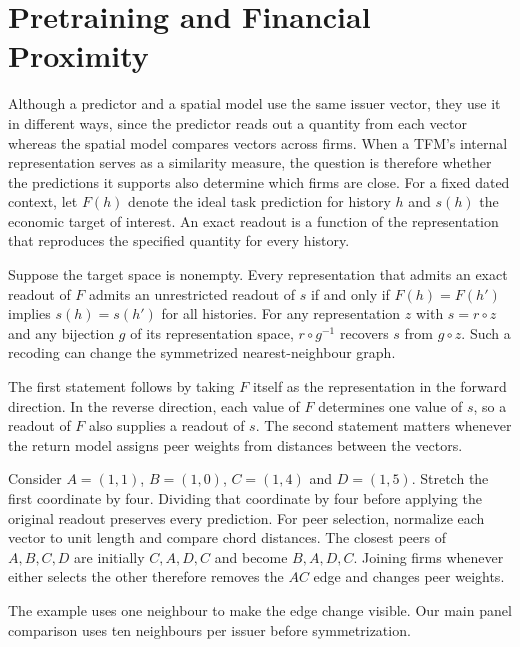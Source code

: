 \section{Pretraining and Financial Proximity}

Although a predictor and a spatial model use the same issuer vector, they
use it in different ways, since the predictor reads out a quantity from
each vector whereas the spatial model compares vectors across firms.
When a TFM's internal representation serves as a similarity measure, the
question is therefore whether the predictions it supports also determine
which firms are close.
For a fixed dated context, let $F(h)$
denote the ideal task prediction for history $h$ and $s(h)$ the economic
target of interest. An exact readout is a function of the representation
that reproduces the specified quantity for every history.

\begin{proposition}
  \label{prop:recovery}
  Suppose the target space is nonempty. Every representation that admits
  an exact readout of $F$ admits an unrestricted readout of $s$ if and only
  if $F(h)=F(h')$ implies $s(h)=s(h')$ for all histories.
  For any representation $z$ with $s=r\circ z$ and any bijection $g$ of
  its representation space, $r\circ g^{-1}$ recovers $s$ from $g\circ z$.
  Such a recoding can change the symmetrized nearest-neighbour graph.
\end{proposition}

The first statement follows by taking $F$ itself as the representation
in the forward direction. In the reverse direction, each value of $F$
determines one value of $s$, so a readout of $F$ also supplies a readout
of $s$. The second statement matters whenever the return model assigns
peer weights from distances between the vectors.

Consider $A=(1,1)$, $B=(1,0)$, $C=(1,4)$ and $D=(1,5)$.
Stretch the first coordinate by four. Dividing that coordinate by four
before applying the original readout preserves every prediction.
For peer selection, normalize each vector to unit
length and compare chord distances. The closest peers of $A,B,C,D$ are
initially $C,A,D,C$ and become $B,A,D,C$. Joining firms whenever either
selects the other therefore removes the $AC$ edge and changes peer weights.

The example uses one neighbour to make the edge change visible. Our
main panel comparison uses ten neighbours per issuer before symmetrization.

